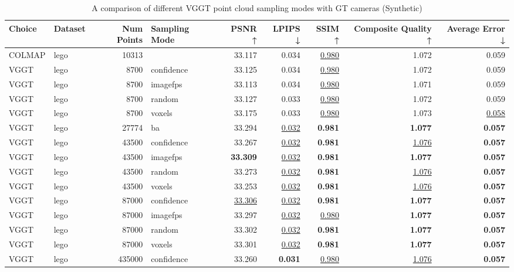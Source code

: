 \begin{table}[H]
\caption{\ifdefined\customcaption \customcaption \else A comparison of different VGGT point cloud sampling modes with GT cameras (Synthetic) \fi}
\label{tab:03_sampling_mode_gt_cams_synthetic}
\centering
\scriptsize
\begin{tabular}{llrlrrrrr}
\toprule
Choice & Dataset & Num Points & Sampling Mode & PSNR ↑ & LPIPS ↓ & SSIM ↑ & Composite Quality ↑ & Average Error ↓ \\
\midrule
COLMAP & lego & 10313 &  & 33.117 & 0.034 & \underline{0.980} & 1.072 & 0.059 \\
VGGT & lego & 8700 & confidence & 33.125 & 0.034 & \underline{0.980} & 1.072 & 0.059 \\
VGGT & lego & 8700 & imagefps & 33.113 & 0.034 & \underline{0.980} & 1.071 & 0.059 \\
VGGT & lego & 8700 & random & 33.127 & 0.033 & \underline{0.980} & 1.072 & 0.059 \\
VGGT & lego & 8700 & voxels & 33.175 & 0.033 & \underline{0.980} & 1.073 & \underline{0.058} \\
VGGT & lego & 27774 & ba & 33.294 & \underline{0.032} & \textbf{0.981} & \textbf{1.077} & \textbf{0.057} \\
VGGT & lego & 43500 & confidence & 33.267 & \underline{0.032} & \textbf{0.981} & \underline{1.076} & \textbf{0.057} \\
VGGT & lego & 43500 & imagefps & \textbf{33.309} & \underline{0.032} & \textbf{0.981} & \textbf{1.077} & \textbf{0.057} \\
VGGT & lego & 43500 & random & 33.273 & \underline{0.032} & \textbf{0.981} & \underline{1.076} & \textbf{0.057} \\
VGGT & lego & 43500 & voxels & 33.253 & \underline{0.032} & \textbf{0.981} & \underline{1.076} & \textbf{0.057} \\
VGGT & lego & 87000 & confidence & \underline{33.306} & \underline{0.032} & \textbf{0.981} & \textbf{1.077} & \textbf{0.057} \\
VGGT & lego & 87000 & imagefps & 33.297 & \underline{0.032} & \underline{0.980} & \textbf{1.077} & \textbf{0.057} \\
VGGT & lego & 87000 & random & 33.302 & \underline{0.032} & \textbf{0.981} & \textbf{1.077} & \textbf{0.057} \\
VGGT & lego & 87000 & voxels & 33.301 & \underline{0.032} & \textbf{0.981} & \textbf{1.077} & \textbf{0.057} \\
VGGT & lego & 435000 & confidence & 33.260 & \textbf{0.031} & \underline{0.980} & \underline{1.076} & \textbf{0.057} \\

\end{tabular}
\end{table}
